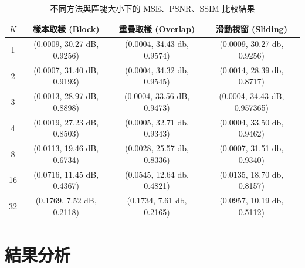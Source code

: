 \documentclass[a4paper,  10pt, oneside, fleqn]{article}
\begin{document}
\begin{table}[h]
    \centering
    \begin{tabular}{cccc}
        \hline
        $K$ & 樣本取樣 (Block)               & 重疊取樣 (Overlap)             & 滑動視窗 (Sliding)               \\
        \hline
        1   & (0.0009, 30.27 dB, 0.9256) & (0.0004, 34.43 db, 0.9574) & (0.0009, 30.27 db, 0.9256)   \\
        \hline
        2   & (0.0007, 31.40 dB, 0.9193) & (0.0004, 34.32 db, 0.9545) & (0.0014, 28.39 db, 0.8717)   \\
        \hline
        3   & (0.0013, 28.97 dB, 0.8898) & (0.0004, 33.56 dB, 0.9473) & (0.0004, 34.43 dB, 0.957365) \\
        \hline
        4   & (0.0019, 27.23 dB, 0.8503) & (0.0005, 32.71 db, 0.9343) & (0.0004, 33.50 db, 0.9462)   \\
        \hline
        8   & (0.0113, 19.46 dB, 0.6734) & (0.0028, 25.57 db, 0.8336) & (0.0007, 31.51 db, 0.9340)   \\
        \hline
        16  & (0.0716, 11.45 dB, 0.4367) & (0.0545, 12.64 db, 0.4821) & (0.0135, 18.70 db, 0.8157)   \\
        \hline
        32  & (0.1769,  7.52 dB, 0.2118) & (0.1734,  7.61 db, 0.2165) & (0.0957, 10.19 db, 0.5112)   \\
        \hline
    \end{tabular}
    \caption{不同方法與區塊大小下的 MSE、PSNR、SSIM 比較結果}
    \label{tab:results}
\end{table}


\section*{結果分析}
\end{document}

